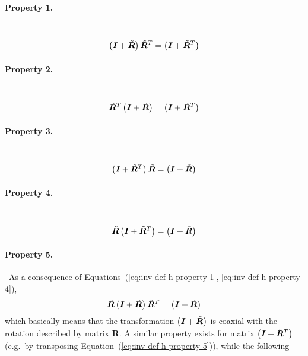 \documentclass[10pt,fleqn,subeqn]{report}
\newcommand{\T}[1]{\bm{#1}}
\begin{document}
\paragraph{Property 1.} \
\begin{equation}
	\plbr{\T{I} + \tilde{\T{R}}} \tilde{\T{R}}^T = \plbr{\T{I} + \tilde{\T{R}}^T}
	\label{eq:inv-def-h-property-1}
\end{equation}

\paragraph{Property 2.} \
\begin{equation}
	\tilde{\T{R}}^T \plbr{\T{I} + \tilde{\T{R}}} = \plbr{\T{I} + \tilde{\T{R}}^T}
	\label{eq:inv-def-h-property-2}
\end{equation}

\paragraph{Property 3.} \
\begin{equation}
	\plbr{\T{I} + \tilde{\T{R}}^T} \tilde{\T{R}} = \plbr{\T{I} + \tilde{\T{R}}}
	\label{eq:inv-def-h-property-3}
\end{equation}

\paragraph{Property 4.} \
\begin{equation}
	\tilde{\T{R}} \plbr{\T{I} + \tilde{\T{R}}^T} = \plbr{\T{I} + \tilde{\T{R}}}
	\label{eq:inv-def-h-property-4}
\end{equation}

\paragraph{Property 5.} \
As a consequence
of Equations~(\ref{eq:inv-def-h-property-1}, \ref{eq:inv-def-h-property-4}),
\begin{equation}
	\tilde{\T{R}} \plbr{\T{I} + \tilde{\T{R}}} \tilde{\T{R}}^T = \plbr{\T{I} + \tilde{\T{R}}}
	\label{eq:inv-def-h-property-5}
\end{equation}
which basically means that the transformation $\plbr{\T{I} + \tilde{\T{R}}}$
is coaxial with the rotation described by matrix $\tilde{\T{R}}$.
A similar property exists for matrix $\plbr{\T{I} + \tilde{\T{R}}^T}$
(e.g.\ by transposing Equation~(\ref{eq:inv-def-h-property-5})),
while the following
\end{document}
